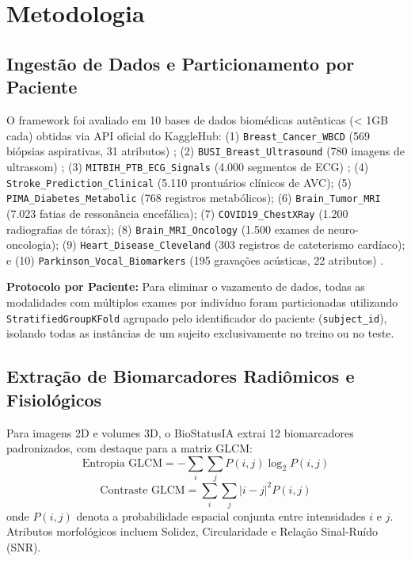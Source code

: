 \documentclass[conference]{IEEEtran}
\begin{document}
\section{Metodologia}

\subsection{Ingestão de Dados e Particionamento por Paciente}
O framework foi avaliado em 10 bases de dados biomédicas autênticas (< 1GB cada) obtidas via API oficial do KaggleHub:
(1) \texttt{Breast\_Cancer\_WBCD} (569 biópsias aspirativas, 31 atributos) \cite{brown2024evaluation};
(2) \texttt{BUSI\_Breast\_Ultrasound} (780 imagens de ultrassom) \cite{busi2020};
(3) \texttt{MITBIH\_PTB\_ECG\_Signals} (4.000 segmentos de ECG) \cite{physionet2000};
(4) \texttt{Stroke\_Prediction\_Clinical} (5.110 prontuários clínicos de AVC);
(5) \texttt{PIMA\_Diabetes\_Metabolic} (768 registros metabólicos);
(6) \texttt{Brain\_Tumor\_MRI} (7.023 fatias de ressonância encefálica);
(7) \texttt{COVID19\_ChestXRay} (1.200 radiografias de tórax);
(8) \texttt{Brain\_MRI\_Oncology} (1.500 exames de neuro-oncologia);
(9) \texttt{Heart\_Disease\_Cleveland} (303 registros de cateterismo cardíaco); e
(10) \texttt{Parkinson\_Vocal\_Biomarkers} (195 gravações acústicas, 22 atributos) \cite{kim2024integrating, xu2024llm}.

\textbf{Protocolo por Paciente:} Para eliminar o vazamento de dados, todas as modalidades com múltiplos exames por indivíduo foram particionadas utilizando \texttt{StratifiedGroupKFold} agrupado pelo identificador do paciente (\texttt{subject\_id}), isolando todas as instâncias de um sujeito exclusivamente no treino ou no teste.

\subsection{Extração de Biomarcadores Radiômicos e Fisiológicos}
Para imagens 2D e volumes 3D, o BioStatusIA extrai 12 biomarcadores padronizados, com destaque para a matriz GLCM:
\begin{equation}
\text{Entropia GLCM} = -\sum_{i}\sum_{j} P(i,j) \log_2 P(i,j)
\end{equation}
\begin{equation}
\text{Contraste GLCM} = \sum_{i}\sum_{j} |i - j|^2 P(i,j)
\end{equation}
onde $P(i,j)$ denota a probabilidade espacial conjunta entre intensidades $i$ e $j$. Atributos morfológicos incluem Solidez, Circularidade e Relação Sinal-Ruído (SNR).
\end{document}
